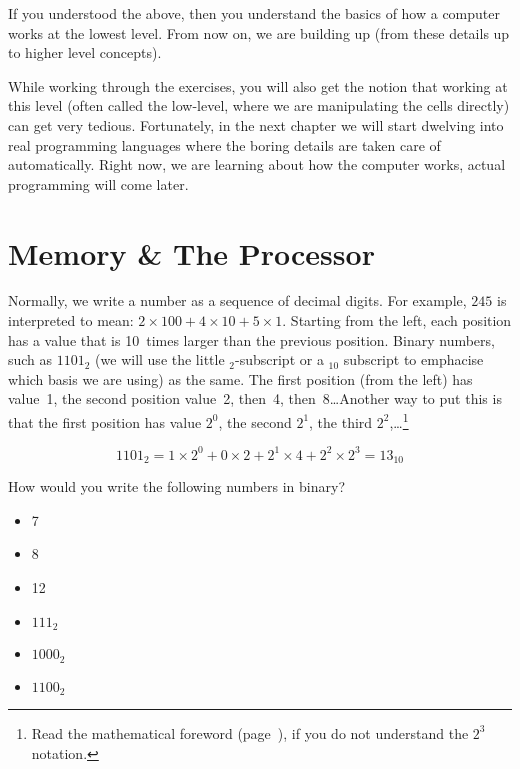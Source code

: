 If you understood the above, then you understand the basics of how a computer
works at the lowest level. From now on, we are building up (from these details
up to higher level concepts).

While working through the exercises, you will also get the notion that working
at this level (often called the low-level, where we are manipulating the cells
directly) can get very tedious. Fortunately, in the next chapter we will start
dwelving into real programming languages where the boring details are taken
care of automatically. Right now, we are learning about how the computer works,
actual programming will come later.

\section{Memory \& The Processor}

Normally, we write a number as a sequence of decimal digits. For example, $245$
is interpreted to mean: $2 \times 100 + 4 \times 10 + 5 \times 1$. Starting
from the left, each position has a value that is 10~times larger than the
previous position. Binary numbers, such as $1101_2$ (we will use the little
$_2$-subscript or a $_{10}$ subscript to emphacise which basis we are using) as
the same. The first position (from the left) has value~1, the second position
value~2, then~4, then~8\ldots Another way to put this is that the first
position has value $2^0$, the second $2^1$, the third
$2^2$,\ldots\footnote{Read the mathematical foreword
(page~\pageref{chpt:mathforeword}), if you do not understand the $2^3$
notation.}

\[
1101_2 = 1 \times 2^{0}  + 0 \times 2 + 2^1 \times 4 + 2^2 \times 2^3 = 13_{10}
\]

\begin{exercise}
How would you write the following numbers in binary?

\begin{itemize}
\item 7
\item 8
\item 12
\end{itemize}
\begin{solution}
\begin{itemize}
\item $111_2$
\item $1000_2$
\item $1100_2$
\end{itemize}
\end{solution}
\end{exercise}

